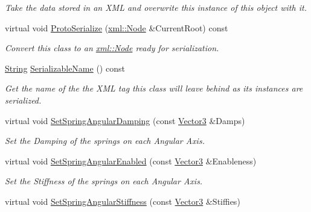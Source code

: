 \begin{DoxyCompactItemize}
\begin{DoxyCompactList}\small\item\em Take the data stored in an XML and overwrite this instance of this object with it. \item\end{DoxyCompactList}\item 
virtual void \hyperlink{classphys_1_1Generic6DofSpringConstraint_aeffb182d5faa82175e96a259fc19f9ff}{ProtoSerialize} (\hyperlink{classphys_1_1xml_1_1Node}{xml::Node} \&CurrentRoot) const 
\begin{DoxyCompactList}\small\item\em Convert this class to an \hyperlink{classphys_1_1xml_1_1Node}{xml::Node} ready for serialization. \item\end{DoxyCompactList}\item 
\hyperlink{namespacephys_aa03900411993de7fbfec4789bc1d392e}{String} \hyperlink{classphys_1_1Generic6DofSpringConstraint_ad0a2d0c49fb622095f18d48b1e52f904}{SerializableName} () const 
\begin{DoxyCompactList}\small\item\em Get the name of the the XML tag this class will leave behind as its instances are serialized. \item\end{DoxyCompactList}\item 
virtual void \hyperlink{classphys_1_1Generic6DofSpringConstraint_a65dbf1070a4277dd0d27e48db2b45c89}{SetSpringAngularDamping} (const \hyperlink{classphys_1_1Vector3}{Vector3} \&Damps)
\begin{DoxyCompactList}\small\item\em Set the Damping of the springs on each Angular Axis. \item\end{DoxyCompactList}\item 
virtual void \hyperlink{classphys_1_1Generic6DofSpringConstraint_a1f861c64cc9d4918bd3dbe606894422e}{SetSpringAngularEnabled} (const \hyperlink{classphys_1_1Vector3}{Vector3} \&Enableness)
\begin{DoxyCompactList}\small\item\em Set the Stiffness of the springs on each Angular Axis. \item\end{DoxyCompactList}\item 
virtual void \hyperlink{classphys_1_1Generic6DofSpringConstraint_ab1d57e737c3471acd9a9481abb9ac612}{SetSpringAngularStiffness} (const \hyperlink{classphys_1_1Vector3}{Vector3} \&Stiffies)

\end{DoxyCompactItemize}
